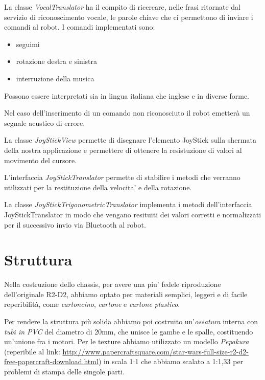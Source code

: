 \documentclass[12pt]{article}
\begin{document}
\bigskip

La classe \emph{VocalTranslator} ha il compito di ricercare, nelle frasi ritornate dal servizio di riconoscimento vocale, le parole chiave che ci permettono di inviare i comandi al robot.
I comandi implementati sono:
\begin{itemize}
\item seguimi
\item rotazione destra e sinistra
\item interruzione della musica
\end{itemize}

Possono essere interpretati sia in lingua italiana che inglese e in diverse forme.

Nel caso dell'inserimento di un comando non riconosciuto il robot emetterà un segnale acustico di errore.

\bigskip

La classe \emph{JoyStickView} permette di disegnare l'elemento JoyStick sulla shermata della nostra applicazione e permettere di ottenere la resistuzione di valori al movimento del cursore.

L'interfaccia \emph{JoyStickTranslator} permette di stabilire i metodi che verranno utilizzati per la restituzione della velocita' e della rotazione.

La classe \emph{JoyStickTrigonometricTranslator} implementa i metodi dell'interfaccia JoyStickTranslator in modo che vengano resituiti dei valori corretti e normalizzati per il successivo invio via Bluetooth al robot.

\section{Struttura}


Nella costruzione dello chassis, per avere una piu' fedele riproduzione dell'originale R2-D2, abbiamo optato per materiali semplici, leggeri e di facile reperibilità, come \emph{cartoncino}, \emph{cartone} e \emph{cartone plastico}.\\
\begin{minipage}{\linewidth}
\medskip
Per rendere la struttura più solida abbiamo poi costruito un'\emph{ossatura} interna con \emph{tubi in PVC} del diametro di 20mm, che unisce le gambe e le spalle, costituendo un'unione fra i motori.
Per le texture abbiamo utilizzato un modello \emph{Pepakura} (reperibile al link: \url{http://www.papercraftsquare.com/star-wars-full-size-r2-d2-free-papercraft-download.html}) in scala 1:1 che abbiamo scalato a 1:1,33 per problemi di stampa delle singole parti.
\medskip
\end{minipage}
\end{document}
